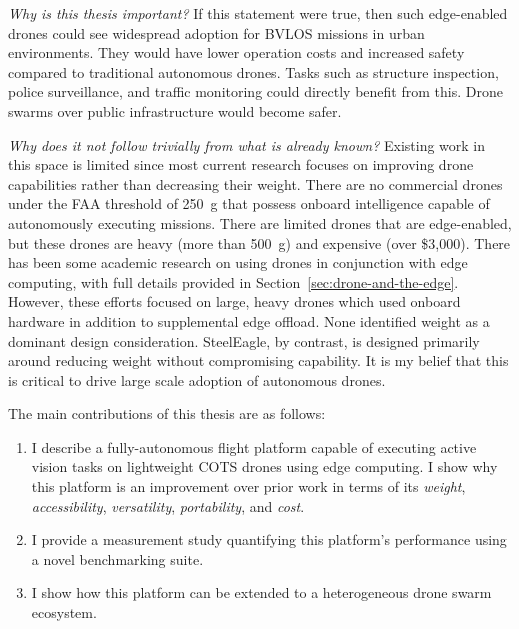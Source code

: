 \textit{Why is this thesis important?} If this statement were true, then such edge-enabled drones could see widespread adoption for BVLOS missions in urban environments. They would have lower operation costs and increased safety compared to traditional autonomous drones. Tasks such as structure inspection, police surveillance, and traffic monitoring could directly benefit from this. Drone swarms over public infrastructure would become safer.

\textit{Why does it not follow trivially from what is already known?} Existing work in this space is limited since most current research focuses on improving drone capabilities rather than decreasing their weight. There are no commercial drones under the FAA threshold of 250~g that possess onboard intelligence capable of autonomously executing  missions. There are limited drones that are edge-enabled, but these drones are heavy (more than 500~g) and expensive (over \$3,000). There has been some academic research on using drones in conjunction with edge computing, with full details provided in Section~\ref{sec:drone-and-the-edge}. However, these efforts focused on large, heavy drones which used onboard hardware in addition to supplemental edge offload. None identified weight as a dominant design consideration. SteelEagle, by contrast, is designed primarily around reducing weight without compromising capability. It is my belief that this is critical to drive large scale adoption of autonomous drones. 

\begin{flushleft}
The main contributions of this thesis are as follows:
\end{flushleft}
\begin{enumerate}
\item I describe a fully-autonomous flight platform capable of executing active vision tasks on lightweight COTS drones using edge computing. I show why this platform is an improvement over prior work in terms of its \textit{weight}, \textit{accessibility}, \textit{versatility}, \textit{portability}, and \textit{cost}.
\item I provide a measurement study quantifying this platform's performance using a novel benchmarking suite.
\item I show how this platform can be extended to a heterogeneous drone swarm ecosystem.  
\end{enumerate}

 

